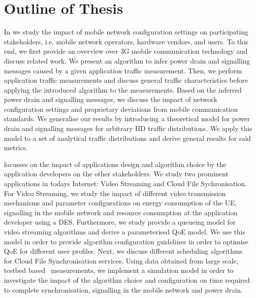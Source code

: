 \section{Outline of Thesis}

In  we study the impact of mobile network configuration settings on participating stakeholders, i.e. mobile network operators, hardware vendors, and users.
To this end, we first provide an overview over \gls{3G} mobile communication technology and discuss related work.
We present an algorithm to infer power drain and signalling messages caused by a given application traffic measurement.
Then, we perform application traffic measurements and discuss general traffic characteristics before applying the introduced algorithm to the measurements.
Based on the inferred power drain and signalling messages, we discuss the impact of network configuration settings and proprietary deviations from mobile communication standards.
We generalise our results by introducing a theoretical model for power drain and signalling messages for arbitrary \gls{IID} traffic distributions.
We apply this model to a set of analytical traffic distributions and derive general results for said metrics. 

 focusses on the impact of applications design and algorithm choice by the application developers on the other stakeholders.
We study two prominent applications in todays Internet: Video Streaming and Cloud File Sychronisation.
For Video Streaming, we study the impact of different video transmission mechanisms and parameter configurations on energy consumption of the \gls{UE}, signalling in the mobile network and resource consumption at the application developer using a \gls{DES}.
Furthermore, we study provide a queueing model for video streaming algorithms and derive a parameterised \gls{QoE} model.
We use this model in order to provide algorithm configuration guidelines in order to optimise \gls{QoE} for different user profiles.
Next, we discuss different scheduling algorithms for Cloud File Synchronisation services.
Using data obtained from large scale, testbed based~\cite{PlanetLab} measurements, we implement a simulation model in order to investigate the impact of the algorithm choice and configuration on time required to complete synchronisation, signalling in the mobile network and power drain.  

